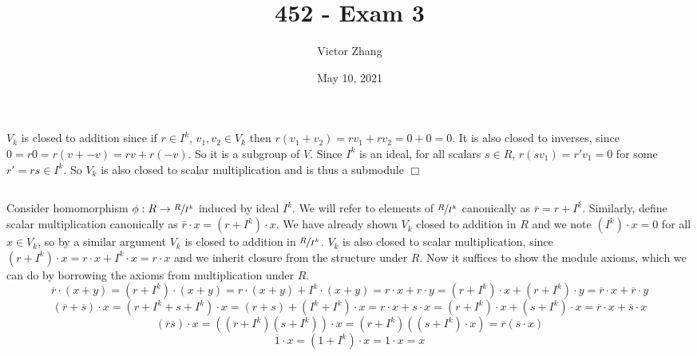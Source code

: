 \documentclass{article}
\title{452 - Exam 3}
\author{Victor Zhang}
\date{May 10, 2021}
\begin{document}
\maketitle

\section{}
\subsection{}
$V_k$ is closed to addition since if $r \in I^k$, $v_1,v_2 \in V_k$ then $r(v_1 + v_2) = rv_1 + rv_2 = 0 + 0 = 0$. It is also closed to inverses, since $0 = r0 = r(v + -v) = rv + r(-v)$. So it is a subgroup of $V$. Since $I^k$ is an ideal, for all scalars $s \in R$, $r(sv_1) = r'v_1 = 0$ for some $r' = rs \in I^k$. So $V_k$ is also closed to scalar multiplication and is thus a submodule $\Box$
\subsection{}
Consider homomorphism $\phi : R \to \sfrac{R}{I^k}$ induced by ideal $I^k$. We will refer to elements of $\sfrac{R}{I^k}$ canonically as $\overline{r} = r + I^k$. Similarly, define scalar multiplication canonically as $\overline{r} \cdot x = (r + I^k) \cdot x$. We have already shown $V_k$ closed to addition in $R$ and we note $(I^k) \cdot x = 0$ for all $x \in V_k$, so by a similar argument $V_k$ is closed to addition in $\sfrac{R}{I^k}$. $V_k$ is also closed to scalar multiplication, since $(r + I^k) \cdot x = r \cdot x + I^k \cdot x = r \cdot x$ and we inherit closure from the structure under $R$. Now it suffices to show the module axioms, which we can do by borrowing the axioms from multiplication under $R$.\\
$$\overline{r} \cdot (x+y) = (r + I^k) \cdot (x+y) = r \cdot (x + y) + I^k \cdot (x+y) = r \cdot x + r \cdot y = (r + I^k) \cdot x + (r + I^k) \cdot y = \overline{r} \cdot x + \overline{r} \cdot y$$
$$(\overline{r} + \overline{s}) \cdot x = (r + I^k + s + I^k) \cdot x = (r + s) + (I^k + I^k) \cdot x = r \cdot x + s \cdot x = (r + I^k) \cdot x + (s + I^k) \cdot x = \overline{r} \cdot x + \overline{s} \cdot x$$
$$(\overline{r}\overline{s}) \cdot x = ((r + I^k)(s + I^k)) \cdot x = (r + I^k) ((s + I^k) \cdot x) = \overline{r} (\overline{s} \cdot x)$$
$$\overline{1} \cdot x = (1 + I^k) \cdot x = 1 \cdot x = x$$
\end{document}
